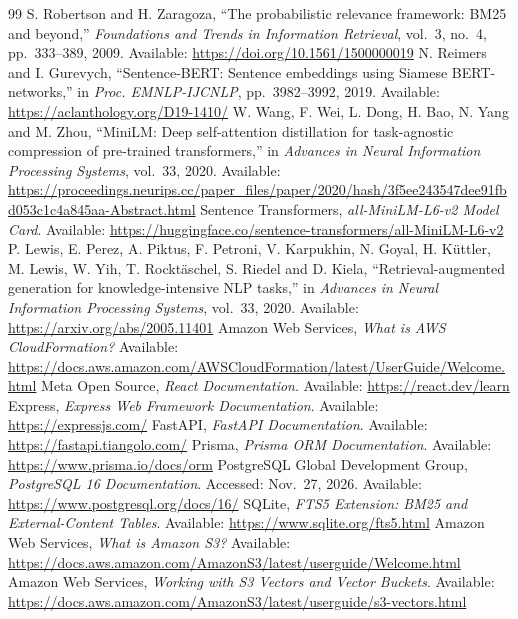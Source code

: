\cleardoublepage
{}
{}
\renewcommand{\bibname}{References}
\begin{thebibliography}{99}
\setlength{\itemsep}{0.3em}
 S. Robertson and H. Zaragoza, ``The probabilistic relevance framework: BM25 and beyond,'' \emph{Foundations and Trends in Information Retrieval}, vol.~3, no.~4, pp.~333--389, 2009. Available: \url{https://doi.org/10.1561/1500000019}
 N. Reimers and I. Gurevych, ``Sentence-BERT: Sentence embeddings using Siamese BERT-networks,'' in \emph{Proc. EMNLP-IJCNLP}, pp.~3982--3992, 2019. Available: \url{https://aclanthology.org/D19-1410/}
 W. Wang, F. Wei, L. Dong, H. Bao, N. Yang and M. Zhou, ``MiniLM: Deep self-attention distillation for task-agnostic compression of pre-trained transformers,'' in \emph{Advances in Neural Information Processing Systems}, vol.~33, 2020. Available: \url{https://proceedings.neurips.cc/paper_files/paper/2020/hash/3f5ee243547dee91fbd053c1c4a845aa-Abstract.html}
 Sentence Transformers, \emph{all-MiniLM-L6-v2 Model Card}. Available: \url{https://huggingface.co/sentence-transformers/all-MiniLM-L6-v2}
 P. Lewis, E. Perez, A. Piktus, F. Petroni, V. Karpukhin, N. Goyal, H. K\"uttler, M. Lewis, W. Yih, T. Rockt\"aschel, S. Riedel and D. Kiela, ``Retrieval-augmented generation for knowledge-intensive NLP tasks,'' in \emph{Advances in Neural Information Processing Systems}, vol.~33, 2020. Available: \url{https://arxiv.org/abs/2005.11401}
 Amazon Web Services, \emph{What is AWS CloudFormation?} Available: \url{https://docs.aws.amazon.com/AWSCloudFormation/latest/UserGuide/Welcome.html}
 Meta Open Source, \emph{React Documentation}. Available: \url{https://react.dev/learn}
 Express, \emph{Express Web Framework Documentation}. Available: \url{https://expressjs.com/}
 FastAPI, \emph{FastAPI Documentation}. Available: \url{https://fastapi.tiangolo.com/}
 Prisma, \emph{Prisma ORM Documentation}. Available: \url{https://www.prisma.io/docs/orm}
 PostgreSQL Global Development Group, \emph{PostgreSQL 16 Documentation}. Accessed: Nov.~27, 2026. Available: \url{https://www.postgresql.org/docs/16/}
 SQLite, \emph{FTS5 Extension: BM25 and External-Content Tables}. Available: \url{https://www.sqlite.org/fts5.html}
 Amazon Web Services, \emph{What is Amazon S3?} Available: \url{https://docs.aws.amazon.com/AmazonS3/latest/userguide/Welcome.html}
 Amazon Web Services, \emph{Working with S3 Vectors and Vector Buckets}. Available: \url{https://docs.aws.amazon.com/AmazonS3/latest/userguide/s3-vectors.html}

\end{thebibliography}
